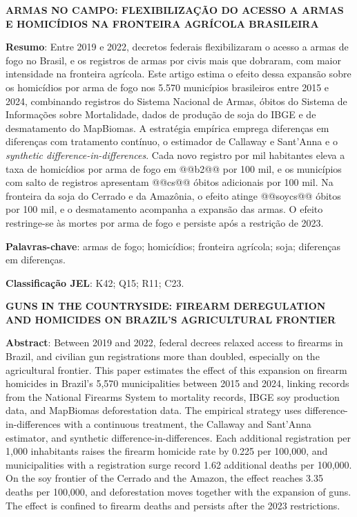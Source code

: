 \documentclass[12pt,a4paper]{article}
\begin{document}
\begin{center}
\textbf{ARMAS NO CAMPO: FLEXIBILIZAÇÃO DO ACESSO A ARMAS E HOMICÍDIOS NA FRONTEIRA AGRÍCOLA BRASILEIRA}
\end{center}

\noindent\textbf{Resumo}: Entre 2019 e 2022, decretos federais flexibilizaram o acesso a armas de fogo no Brasil, e os registros de armas por civis mais que dobraram, com maior intensidade na fronteira agrícola. Este artigo estima o efeito dessa expansão sobre os homicídios por arma de fogo nos 5.570 municípios brasileiros entre 2015 e 2024, combinando registros do Sistema Nacional de Armas, óbitos do Sistema de Informações sobre Mortalidade, dados de produção de soja do IBGE e de desmatamento do MapBiomas. A estratégia empírica emprega diferenças em diferenças com tratamento contínuo, o estimador de Callaway e Sant'Anna e o \textit{synthetic difference-in-differences}. Cada novo registro por mil habitantes eleva a taxa de homicídios por arma de fogo em @@b2@@ por 100 mil, e os municípios com salto de registros apresentam @@cs@@ óbitos adicionais por 100 mil. Na fronteira da soja do Cerrado e da Amazônia, o efeito atinge @@soycs@@ óbitos por 100 mil, e o desmatamento acompanha a expansão das armas. O efeito restringe-se às mortes por arma de fogo e persiste após a restrição de 2023.

\noindent\textbf{Palavras-chave}: armas de fogo; homicídios; fronteira agrícola; soja; diferenças em diferenças.

\noindent\textbf{Classificação JEL}: K42; Q15; R11; C23.

\noindent\textbf{GUNS IN THE COUNTRYSIDE: FIREARM DEREGULATION AND HOMICIDES ON BRAZIL'S AGRICULTURAL FRONTIER}

\noindent\textbf{Abstract}: Between 2019 and 2022, federal decrees relaxed access to firearms in Brazil, and civilian gun registrations more than doubled, especially on the agricultural frontier. This paper estimates the effect of this expansion on firearm homicides in Brazil's 5,570 municipalities between 2015 and 2024, linking records from the National Firearms System to mortality records, IBGE soy production data, and MapBiomas deforestation data. The empirical strategy uses difference-in-differences with a continuous treatment, the Callaway and Sant'Anna estimator, and synthetic difference-in-differences. Each additional registration per 1,000 inhabitants raises the firearm homicide rate by 0.225 per 100,000, and municipalities with a registration surge record 1.62 additional deaths per 100,000. On the soy frontier of the Cerrado and the Amazon, the effect reaches 3.35 deaths per 100,000, and deforestation moves together with the expansion of guns. The effect is confined to firearm deaths and persists after the 2023 restrictions.
\end{document}

